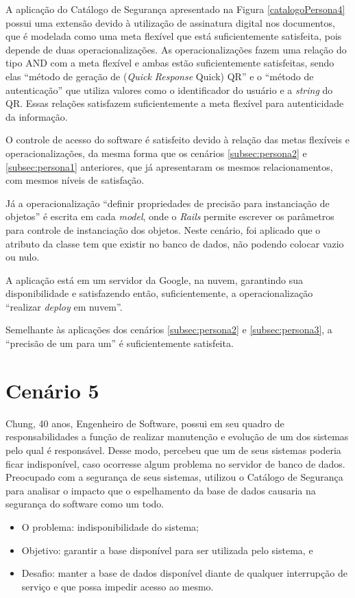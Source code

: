 A aplicação do Catálogo de Segurança apresentado na Figura \ref{catalogoPersona4} possui uma extensão devido à utilização de assinatura digital nos documentos, que é modelada como uma meta flexível que está suficientemente satisfeita, pois depende de duas operacionalizações. As operacionalizações fazem uma relação do tipo AND com a meta flexível e ambas estão suficientemente satisfeitas, sendo elas “método de geração de (\textit{Quick Response} Quick) QR” e o  “método de autenticação” que utiliza valores como o identificador do usuário e a \textit{string} do QR. Essas relações satisfazem suficientemente a meta flexível para autenticidade da informação. 

O controle de acesso do software é satisfeito devido à relação das metas flexíveis e operacionalizações, da mesma forma que os cenários \ref{subsec:persona2} e \ref{subsec:persona1} anteriores, que já apresentaram os mesmos relacionamentos, com mesmos níveis de satisfação.  

Já a operacionalização “definir propriedades de precisão para instanciação de objetos” é escrita em cada \textit{model}, onde o \textit{Rails} permite escrever os parâmetros para controle de instanciação dos objetos. Neste cenário, foi aplicado que o atributo da classe tem que existir no banco de dados, não podendo colocar vazio ou nulo. 

A aplicação está em um servidor da Google, na nuvem, garantindo sua disponibilidade e satisfazendo então, suficientemente, a operacionalização “realizar \textit{deploy} em nuvem”. 

Semelhante às aplicações dos cenários \ref{subsec:persona2} e \ref{subsec:persona3}, a “precisão de um para um” é suficientemente satisfeita. 

\section{Cenário 5}
\label{subsec:persona5}

Chung, 40 anos, Engenheiro de Software, possui em seu quadro de responsabilidades a função de realizar manutenção e evolução de um dos sistemas pelo qual é responsável. Desse modo, percebeu que um de seus sistemas poderia ficar indisponível, caso ocorresse algum problema no servidor de banco de dados. Preocupado com a segurança de seus sistemas, utilizou o Catálogo de Segurança para analisar o impacto que o espelhamento da base de dados causaria na segurança do software como um todo. 

\begin{itemize}
	\item O problema: indisponibilidade do sistema; 
	\item Objetivo: garantir a base disponível para ser utilizada pelo sistema, e
	\item Desafio: manter a base de dados disponível diante de qualquer interrupção de serviço e que possa impedir acesso ao mesmo.
\end{itemize}

